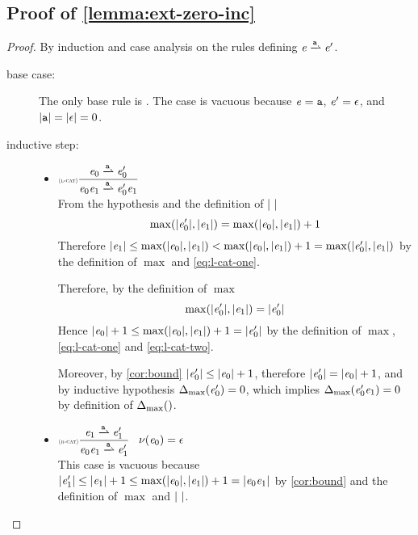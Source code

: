 \subsection*{Proof of \cref{lemma:ext-zero-inc}}
\begin{proof}
 By induction and case analysis on the rules defining $\re\parDer{\sym}\re'$.
 \begin{description}
  \item[base case:] The only base rule is .
   The case is vacuous because $\mathit {e}=\mathtt {a}$, $\mathit {e}'=\mathtt {\epsilon}$, and ${\mid}{\mathtt {a}}{\mid}={\mid}{\mathtt {\epsilon}}{\mid}=0$.
  \item[inductive step:] \hspace*{\fill}
   \begin{itemize}
    \item $\Rule{l-cat}{\re_0\parDer{\sym}\re'_0}{\re_0\catop\re_1\parDer{\sym}\re'_0\catop\re_1}{}$\\[2ex]
          From the hypothesis and the definition of ${\mid}{\ }{\mid}$
          \begin{equation}
           \label{eq:l-cat-one}
           \max({\mid}{\mathit {e}_0'}{\mid},{\mid}{\mathit {e}_1}{\mid})=\max({\mid}{\mathit {e}_0}{\mid},{\mid}{\mathit {e}_1}{\mid})+1
          \end{equation}
          Therefore ${\mid}{\mathit {e}_1}{\mid}\leq\max({\mid}{\mathit {e}_0}{\mid},{\mid}{\mathit {e}_1}{\mid})<\max({\mid}{\mathit {e}_0}{\mid},{\mid}{\mathit {e}_1}{\mid})+1=\max({\mid}{\mathit {e}_0'}{\mid},{\mid}{\mathit {e}_1}{\mid})$ by the definition of $\max$ and \cref{eq:l-cat-one}.

          Therefore, by the definition of $\max$
          \begin{equation}
           \label{eq:l-cat-two}
           \max({\mid}{\mathit {e}_0'}{\mid},{\mid}{\mathit {e}_1}{\mid})={\mid}{\mathit {e}_0'}{\mid}
          \end{equation}
          Hence ${\mid}{\mathit {e}_0}{\mid}+1\leq\max({\mid}{\mathit {e}_0}{\mid},{\mid}{\mathit {e}_1}{\mid})+1={\mid}{\mathit {e}'_0}{\mid}$ by the definition of $\max$, \cref{eq:l-cat-one} and \cref{eq:l-cat-two}.

          Moreover, by \cref{cor:bound} ${\mid}{\mathit {e}_0'}{\mid}\leq{\mid}{\ensuremath{\mathit {e}}_0}{\mid}+1$, therefore
          ${\mid}{\mathit {e}_0'}{\mid}={\mid}{\mathit {e}_0}{\mid}+1$, and by inductive hypothesis ${\Delta_{\max}}({\mathit {e}'_0})=0$, which implies ${\Delta_{\max}}({\mathit {e}'_0\mathit {e}_1})=0$ by definition of ${\Delta_{\max}}({})$.

    \item $\Rule{r-cat}{\re_1\parDer{\sym}\re'_1}{\re_0\catop\re_1\parDer{\sym}\re'_1}{\hasEps{\re_0}=\eps}$\\[2ex]
          This case is vacuous because ${\mid}{\mathit {e}_1'}{\mid}\leq{\mid}{\ensuremath{\mathit {e}}_1}{\mid}+1\leq\max({\mid}{\mathit {e}_0}{\mid},{\mid}{\mathit {e}_1}{\mid})+1={\mid}{\mathit {e}_0\mathit {e}_1}{\mid}$ by \cref{cor:bound} and the definition of $\max$ and ${\mid}{\ }{\mid}$.


\end{itemize}
\end{description}
\end{proof}

